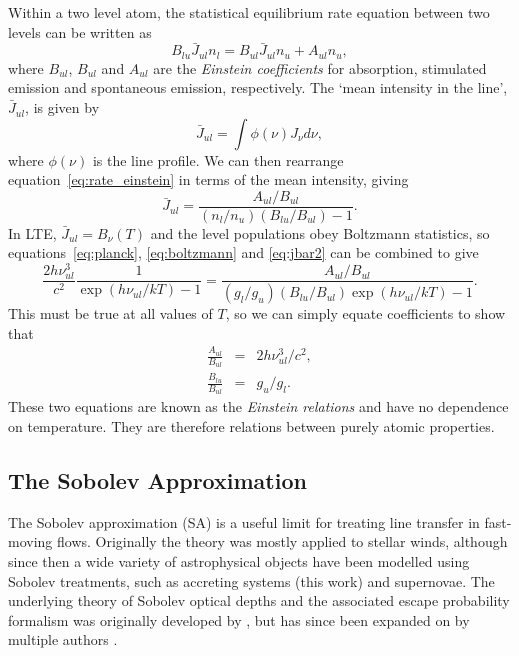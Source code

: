 Within a two level atom, the statistical equilibrium 
rate equation between two levels can be written as
\begin{equation}
B_{lu} \bar{J}_{ul} n_l = B_{ul} \bar{J}_{ul} n_u + A_{ul} n_u,
\label{eq:rate_einstein}
\end{equation}
where $B_{ul}$, $B_{ul}$ and $A_{ul}$ are the {\em Einstein coefficients}
for absorption, stimulated emission and spontaneous emission, respectively.
The `mean intensity in the line', $\bar{J}_{ul}$, is given by
\begin{equation}
\bar{J}_{ul} = \int \phi(\nu) J_\nu d\nu,
\label{eq:jbar}
\end{equation}
where $\phi(\nu)$ is the line profile.
We can then rearrange equation~\ref{eq:rate_einstein} in terms of 
the mean intensity, giving
\begin{equation}
\bar{J}_{ul} = \frac{A_{ul} / B_{ul}}{(n_l/n_u)(B_{lu}/B_{ul}) - 1}.
\label{eq:jbar2}
\end{equation}
In LTE, $\bar{J}_{ul} = B_\nu (T)$ and the level populations obey Boltzmann statistics, 
so equations~\ref{eq:planck}, \ref{eq:boltzmann}
and \ref{eq:jbar2}  can be combined to give
\begin{equation}
\frac{2 h \nu_{ul}^3}{c^2} \frac{1}{\exp(h\nu_{ul} / kT) - 1} =
\frac{A_{ul}/B_{ul}}{(g_l/g_u)(B_{lu}/B_{ul}) \exp(h\nu_{ul} / kT) - 1}.
\end{equation}
This must be true at all values of $T$, so we can 
simply equate coefficients to show that
\begin{eqnarray}
\frac{A_{ul}}{B_{ul}} &=& 2 h \nu_{ul}^3/c^2, \\  
\frac{B_{lu}}{B_{ul}} &=& g_u/g_l.  
 \label{eq:einstein_relations}     
\end{eqnarray}
These two equations are known as the {\em Einstein relations} and have 
no dependence on temperature. They are therefore relations between 
purely atomic properties.

\subsection{The Sobolev Approximation}
\label{sec:sobolev}
The Sobolev approximation (SA) is a useful limit 
for treating line transfer in fast-moving flows. Originally 
the theory was mostly applied to stellar winds, although since then
a wide variety of astrophysical objects have been modelled using Sobolev treatments,
such as accreting systems (this work) and supernovae. The underlying theory
of Sobolev optical depths and the associated escape probability formalism
was originally developed by \cite{sobolev1957,sobolev1960}, but has since
been expanded on by multiple authors 
\citep[e.g.][]{rybicki1970,rybickihummer1978,hubeny2001rt}.

